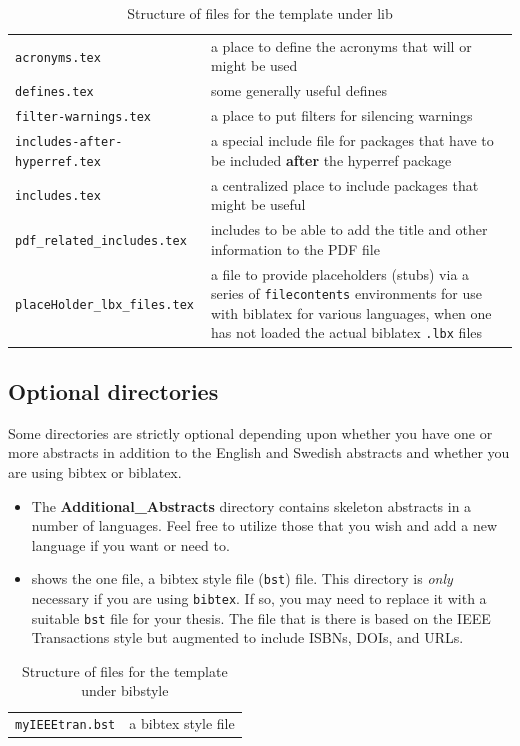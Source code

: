 \documentclass[12pt, twoside]{article}
\newcommand{\dname}[1]{\textbf{#1}}
\newcommand{\fname}[1]{\texttt{#1}}
\begin{document}
\clearpage
\begin{table}[!ht]
    \caption{Structure of files for the template under lib}
    \label{tab:file_structure_lib}
    \begin{tabular}{L{7.5cm}<{\footnotesize} L{6cm}}
\hline
\fname{acronyms.tex} & a place to define the acronyms that will or might be used \\
\fname{defines.tex} & some generally useful defines \\
\fname{filter-warnings.tex} & a place to put filters for silencing warnings \\
\fname{includes-after-hyperref.tex} & a special include file for packages that have to be included \textbf{after} the hyperref package \\
\fname{includes.tex} & a centralized place to include packages that might be useful \\
\fname{pdf\_related\_includes.tex} & includes to be able to add the title and other information to the PDF file \\
\fname{placeHolder\_lbx\_files.tex} & a file to provide placeholders (stubs) via a series of \texttt{filecontents} environments for use with biblatex for various languages, when one has not loaded the actual biblatex \fname{.lbx} files\\
\end{tabular}
\end{table}
\FloatBarrier

\subsection{Optional directories}
Some directories are strictly optional depending upon whether you have one or more abstracts in addition to the English and Swedish abstracts and whether you are using bibtex or biblatex.
\begin{itemize}
    \item The \dname{Additional\_Abstracts} directory contains skeleton abstracts in a number of languages. Feel free to utilize those that you wish and add a new language if you want or need to.

    \item {} shows the one file, a bibtex style file (\fname{bst}) file. This directory is \textit{only} necessary if you are using \texttt{bibtex}. If so, you may need to replace it with a suitable \fname{bst} file for your thesis. The file that is there is based on the IEEE Transactions style but augmented to include \glspl{ISBN}, \glspl{DOI}, and \glspl{URL}.
\end{itemize}
\begin{table}[!ht]
    \caption{Structure of files for the template under bibstyle}
    \label{tab:file_structure_bibstyle}
    \begin{tabular}{L{7.5cm}<{\footnotesize} L{6cm}}
\hline
\fname{myIEEEtran.bst} & a bibtex style file  \\
\end{tabular}
\end{table}
\FloatBarrier
\end{document}
